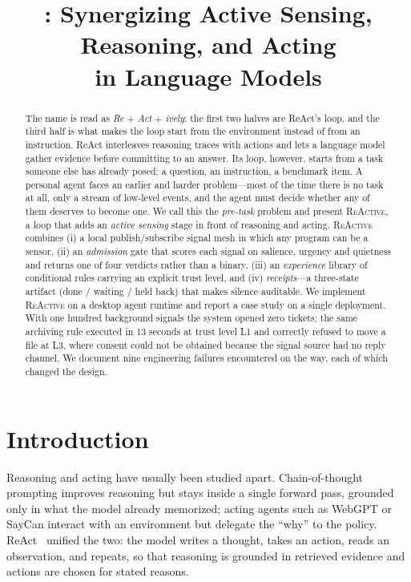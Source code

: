 \documentclass[10pt,a4paper]{article}
\title{\sys: Synergizing Active Sensing, Reasoning, and Acting\\ in Language Models}
\author{}
\date{}
\newcommand{\sys}{\textsc{ReActive}}
\begin{document}
\maketitle

\begin{abstract}
The name is read as \emph{Re} $+$ \emph{Act} $+$ \emph{ively}: the first two halves are ReAct's loop, and the third half is what makes the loop start from the environment instead of from an instruction. ReAct interleaves reasoning traces with actions and lets a language model
gather evidence before committing to an answer. Its loop, however, starts
from a task someone else has already posed: a question, an instruction, a
benchmark item. A personal agent faces an earlier and harder problem---most
of the time there is no task at all, only a stream of low-level events, and
the agent must decide whether any of them deserves to become one. We call
this the \emph{pre-task} problem and present \sys, a loop that adds an
\emph{active sensing} stage in front of reasoning and acting. \sys{}
combines (i) a local publish/subscribe signal mesh in which any program can
be a sensor, (ii) an \emph{admission} gate that scores each signal on
salience, urgency and quietness and returns one of four verdicts rather than
a binary, (iii) an \emph{experience} library of conditional rules carrying an
explicit trust level, and (iv) \emph{receipts}---a three-state artifact
(done / waiting / held back) that makes silence auditable. We implement
\sys{} on a desktop agent runtime and report a case study on a single
deployment. With one hundred background signals the system opened zero
tickets; the same archiving rule executed in 13 seconds at trust level L1
and correctly refused to move a file at L3, where consent could not be
obtained because the signal source had no reply channel. We document nine
engineering failures encountered on the way, each of which changed the design.
\end{abstract}

\section{Introduction}

Reasoning and acting have usually been studied apart. Chain-of-thought
prompting improves reasoning but stays inside a single forward pass, grounded
only in what the model already memorized; acting agents such as WebGPT or
SayCan interact with an environment but delegate the ``why'' to the policy.
ReAct~\cite{react} unified the two: the model writes a thought, takes an
action, reads an observation, and repeats, so that reasoning is grounded in
retrieved evidence and actions are chosen for stated reasons.
\end{document}
